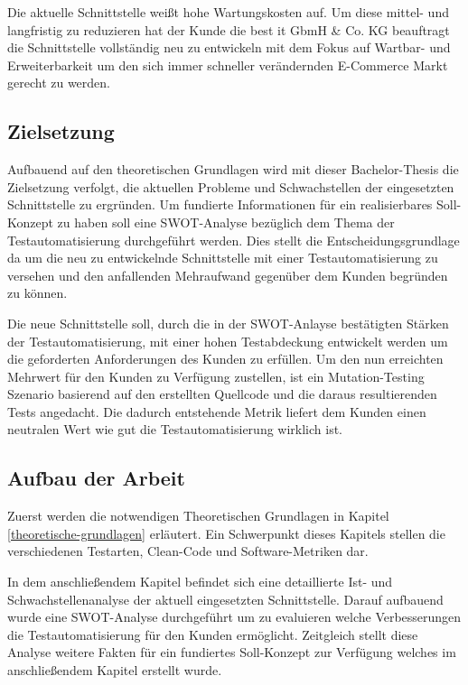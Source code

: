Die aktuelle Schnittstelle weißt hohe Wartungskosten auf. Um diese mittel- und langfristig zu reduzieren hat der Kunde die best it GbmH \& Co. KG beauftragt die Schnittstelle vollständig neu zu entwickeln mit dem Fokus auf Wartbar- und Erweiterbarkeit um den sich immer schneller verändernden E-Commerce Markt gerecht zu werden. 

\subsection{Zielsetzung}
Aufbauend auf den theoretischen Grundlagen wird mit dieser Bachelor-Thesis die Zielsetzung verfolgt, die aktuellen Probleme und Schwachstellen der eingesetzten Schnittstelle zu ergründen. Um fundierte Informationen für ein realisierbares Soll-Konzept zu haben soll eine SWOT-Analyse bezüglich dem Thema der Testautomatisierung durchgeführt werden. Dies stellt die Entscheidungsgrundlage da um die neu zu entwickelnde Schnittstelle mit einer Testautomatisierung zu versehen und den anfallenden Mehraufwand gegenüber dem Kunden begründen zu können. 

Die neue Schnittstelle soll, durch die in der SWOT-Anlayse bestätigten Stärken der Testautomatisierung, mit einer hohen Testabdeckung entwickelt werden um die geforderten Anforderungen des Kunden zu erfüllen. Um den nun erreichten Mehrwert für den Kunden zu Verfügung zustellen, ist ein Mutation-Testing Szenario basierend auf den erstellten Quellcode und die daraus resultierenden Tests angedacht. Die dadurch entstehende Metrik liefert dem Kunden einen neutralen Wert wie gut die Testautomatisierung wirklich ist. 

\subsection{Aufbau der Arbeit}
Zuerst werden die notwendigen Theoretischen Grundlagen in Kapitel \ref{theoretische-grundlagen} erläutert. Ein Schwerpunkt dieses Kapitels stellen die verschiedenen Testarten, Clean-Code und Software-Metriken dar.

In dem anschließendem Kapitel befindet sich eine detaillierte Ist- und Schwachstellenanalyse der aktuell eingesetzten Schnittstelle. Darauf aufbauend wurde eine SWOT-Analyse durchgeführt um zu evaluieren welche Verbesserungen die Testautomatisierung für den Kunden ermöglicht. Zeitgleich stellt diese Analyse weitere Fakten für ein fundiertes Soll-Konzept zur Verfügung welches im anschließendem Kapitel erstellt wurde.


